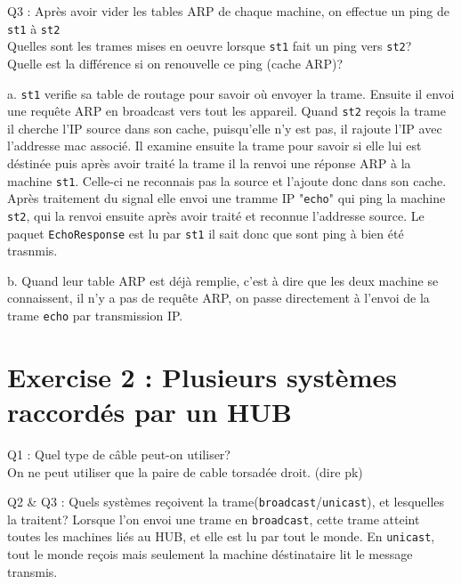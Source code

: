 \documentclass[11pt]{book}
\begin{document}
        \begin{dent}{Q3 :} Après avoir vider les tables ARP de chaque machine, on effectue un ping de \texttt{st1} à \texttt{st2}\\
            Quelles sont les trames mises en oeuvre lorsque \texttt{st1} fait un ping vers \texttt{st2}?\\
            Quelle est la différence si on renouvelle ce ping (cache ARP)?
            \begin{enum}{-15pt}{-15pt}
                \item[a.] \texttt{st1} verifie sa table de routage pour savoir où envoyer la trame. Ensuite il envoi une requête ARP en broadcast vers tout les appareil. Quand \texttt{st2} reçois la trame il cherche l'IP source dans son cache, puisqu'elle n'y est pas, il rajoute l'IP avec l'addresse mac associé. Il examine ensuite la trame pour savoir si elle lui est déstinée puis après avoir traité la trame il la renvoi une réponse ARP à la machine \texttt{st1}. Celle-ci ne reconnais pas la source et l'ajoute donc dans son cache. Après traitement du signal elle envoi une tramme IP "\texttt{echo}" qui ping la machine \texttt{st2}, qui la renvoi ensuite après avoir traité et reconnue l'addresse source. Le paquet \texttt{EchoResponse} est lu par \texttt{st1} il sait donc que sont ping à bien été trasnmis. 
                \item[b.] Quand leur table ARP est déjà remplie, c'est à dire que les deux machine se connaissent, il n'y a pas de requête ARP, on passe directement à l'envoi de la trame \texttt{echo} par transmission IP.
            \end{enum}
         \end{dent}
        
    \section{Exercise 2 : Plusieurs systèmes raccordés par un HUB}
        
        \begin{dent}{Q1 :} Quel type de câble peut-on utiliser?\\
            On ne peut utiliser que la paire de cable torsadée droit. (dire pk)
         \end{dent}

        \begin{dent}{Q2 \& Q3 :} Quels systèmes reçoivent la trame(\texttt{broadcast}/\texttt{unicast}), et lesquelles la traitent?
            Lorsque l'on envoi une trame en \texttt{broadcast}, cette trame atteint toutes les machines liés au HUB, et elle est lu par tout le monde. En \texttt{unicast}, tout le monde reçois mais seulement la machine déstinataire lit le message transmis.     
         \end{dent}
        
\end{document}
